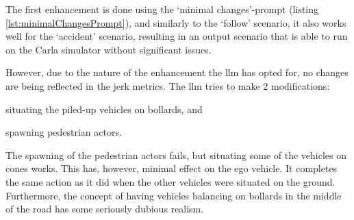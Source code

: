The first enhancement is done using the `minimal changes'-prompt (listing
\ref{lst:minimalChangesPrompt}), and similarly to the `follow' scenario, it also works well for the
`accident' scenario, resulting in an output scenario that is able to run on the Carla simulator
without significant issues.

However, due to the nature of the enhancement the \acrshort{llm} has opted for, no changes are being
reflected in the jerk metrics. The \acrfull{llm} tries to make 2 modifications: \begin{inparaenum}
    \item situating the piled-up vehicles on bollards,  and
    \item spawning pedestrian actors.
\end{inparaenum}
The spawning of the pedestrian actors fails, but situating some of the vehicles on cones works. This
has, however, minimal effect on the ego vehicle. It completes the same action as it did when the
other vehicles were situated on the ground. Furthermore, the concept of having vehicles balancing on
bollards in the middle of the road has some seriously dubious realism.


